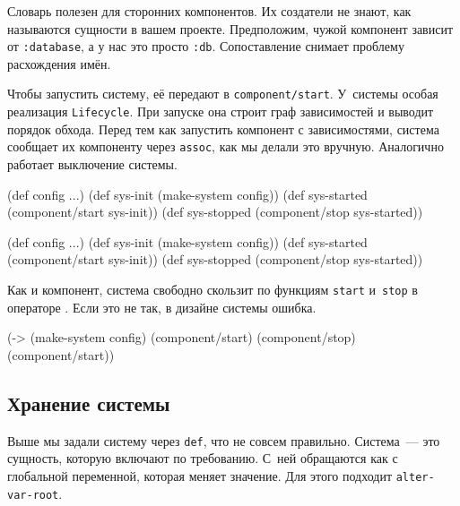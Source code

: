 \fi

Словарь полезен для сторонних компонентов. Их создатели не знают, как называются
сущности в вашем проекте. Предположим, чужой компонент зависит от
\verb|:database|, а у нас это просто \verb|:db|. Сопоставление снимает проблему
расхождения имён.

Чтобы запустить систему, её передают в \verb|component/start|. У~системы
особая реализация \verb|Lifecycle|. При запуске она строит граф зависимостей и
выводит порядок обхода. Перед тем как запустить компонент с зависимостями,
система сообщает их компоненту через \verb|assoc|, как мы делали это
вручную. Аналогично работает выключение системы.

\ifx\DEVICETYPE\MOBILE

\begin{english}
  \begin{clojure}
(def config {...})
(def sys-init (make-system config))
(def sys-started
  (component/start sys-init))
(def sys-stopped
  (component/stop sys-started))
  \end{clojure}
\end{english}

\else

\begin{english}
  \begin{clojure}
(def config {...})
(def sys-init (make-system config))
(def sys-started (component/start sys-init))
(def sys-stopped (component/stop sys-started))
  \end{clojure}
\end{english}

\fi

Как и компонент, система свободно скользит по функциям \verb|start|
и~\verb|stop| в операторе \arr. Если это не так, в дизайне системы ошибка.

\begin{english}
  \begin{clojure}
(-> (make-system config)
    (component/start)
    (component/stop)
    (component/start))
  \end{clojure}
\end{english}

\subsection{Хранение системы}


Выше мы задали систему через \verb|def|, что не совсем правильно. Система~--- это
сущность, которую включают по требованию. С~ней обращаются как с глобальной
переменной, которая меняет значение. Для этого подходит \verb|alter-var-root|.

